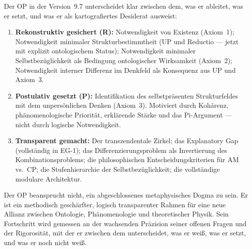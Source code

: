 \documentclass[11pt,a4paper]{article}
\theoremstyle{plain}
\theoremstyle{definition}
\begin{document}
Der OP in der Version~9.7 unterscheidet klar zwischen dem, was er ableitet, was er setzt,
und was er als kartografiertes Desiderat ausweist:

\begin{enumerate}
  \item \textbf{Rekonstruktiv gesichert (R):} Notwendigkeit von Existenz (Axiom~1);
        Notwendigkeit minimaler Strukturbestimmtheit (UP und Reductio --- jetzt mit
        explizit ontologischem Status); Notwendigkeit minimaler Selbstbez\"{u}glichkeit
        als Bedingung ontologischer Wirksamkeit (Axiom~2); Notwendigkeit interner
        Differenz im Denkfeld als Konsequenz aus UP und Axiom~3.

  \item \textbf{Postulativ gesetzt (P):} Identifikation des selbstpr\"{a}senten
        Strukturfeldes mit dem unpers\"{o}nlichen Denken (Axiom~3). Motiviert durch
        Koh\"{a}renz, ph\"{a}nomenologische Priorit\"{a}t, erkl\"{a}rende St\"{a}rke
        und das Pi-Argument --- nicht durch logische Notwendigkeit.

  \item \textbf{Transparent gemacht:} Der transzendentale Zirkel; das Explanatory Gap
        (vollst\"{a}ndig in EG-1); das Differenzierungsproblem als Invertierung des
        Kombinationsproblems; die philosophischen Entscheidungskriterien f\"{u}r AM vs.\
        CP; die Stufenhierarchie der Selbstbez\"{u}glichkeit; die vollst\"{a}ndige
        modulare Architektur.
\end{enumerate}

Der OP beansprucht nicht, ein abgeschlossenes metaphysisches Dogma zu sein. Er ist ein
methodisch gesch\"{a}rfter, logisch transparenter Rahmen f\"{u}r eine neue Allianz
zwischen Ontologie, Ph\"{a}nomenologie und theoretischer Physik. Sein Fortschritt wird
gemessen an der wachsenden Pr\"{a}zision seiner offenen Fragen und der Rigorosit\"{a}t,
mit der er zwischen dem unterscheidet, was er wei\ss{}, was er setzt, und was er noch
nicht wei\ss{}.
\end{document}
